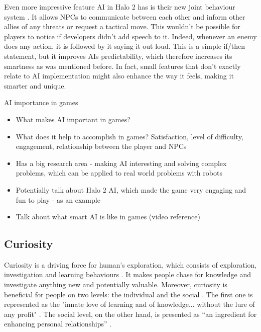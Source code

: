 \documentclass[journal]{IEEEtran}
\begin{document}
Even more impressive feature AI in Halo 2 has is their new joint behaviour system \cite{halo2}. It allows NPCs to communicate between each other and inform other allies of any threats or request a tactical move. This wouldn't be possible for players to notice if developers didn't add speech to it. Indeed, whenever an enemy does any action, it is followed by it saying it out loud. This is a simple if/then statement, but it improves AIs predictability, which therefore increases its smartness as was mentioned before. In fact, small features that don't exactly relate to AI implementation might also enhance the way it feels, making it smarter and unique.

AI importance in games
\begin{itemize}
	\item What makes AI important in games?
	\item What does it help to accomplish in games? Satisfaction, level of difficulty, engagement, relationship between the player and NPCs
	\item Has a big research area - making AI interesting and solving complex problems, which can be applied to real world problems with robots
	\item Potentially talk about Halo 2 AI, which made the game very engaging and fun to play - as an example
	\item Talk about what smart AI is like in games (video reference)
\end{itemize}

\subsection{Curiosity}
Curiosity is a driving force for human's exploration, which consists of exploration, investigation and learning behaviours \cite{wu2013curiosity}\cite{kashdan2004curiosity}. It makes people chase for knowledge and investigate anything new and potentially valuable. Moreover, curiosity is beneficial for people on two levels: the individual and the social \cite{kashdan2010curiosity}. The first one is represented as the "innate love of learning and of knowledge... without the lure of any profit" \cite{loewenstein1994psychology}. The social level, on the other hand, is presented as ``an ingredient for enhancing personal relationships'' \cite{wu2013curiosity}.
\end{document}
